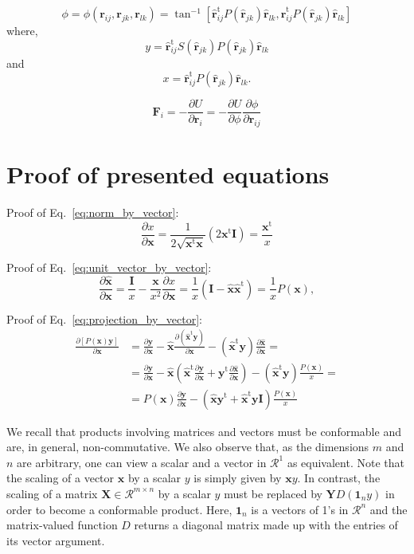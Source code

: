 \documentclass[11pt]{article}
\newcommand{\mt}[1]{\boldsymbol{\mathbf{#1}}}           %
\newcommand{\vt}[1]{\boldsymbol{\mathbf{#1}}}           %
\newcommand{\tr}[1]{#1^\text{t}}                        %
\newcommand{\diff}[2]{\frac{\partial #1}{\partial #2}}  %
\begin{document}
\begin{equation}
\phi = \phi({\vt r}_{ij},{\vt r}_{jk},{\vt r}_{lk}) = \tan^{-1}\left[\tr{\vt{\hat r}}_{ij}P(\vt{\hat r}_{jk})\vt{\hat r}_{lk}, \tr{\vt{\hat r}}_{ij}P(\vt{\hat r}_{jk})\vt{\hat r}_{lk}\right]
\end{equation}
where,
\[
y = \tr{\vt{\hat r}}_{ij} S(\vt{\hat r}_{jk}) P(\vt{\hat r}_{jk}) \vt{\hat r}_{lk}
\]
and
\[
x = \tr{\vt{\hat r}}_{ij}P(\vt{\hat r}_{jk})\vt{\hat r}_{lk}.
\]



\begin{equation}
{\vt F}_i = -\diff{U}{{\vt r}_i} = -\diff{U}{\phi}\diff{\phi}{{\vt r}_{ij}}
\end{equation}

\appendix

\section{Proof of presented equations}

Proof of Eq.~\ref{eq:norm_by_vector}:
\begin{equation}
\diff{x}{\vt x} = \frac{1}{2 \sqrt{\tr{\vt x}{\vt x}}} (2\tr{\vt x}\mt I) = \frac{\tr{\vt x}}{x}
\end{equation}

Proof of Eq.~\ref{eq:unit_vector_by_vector}:
\begin{equation}
\diff{\vt{\hat x}}{\vt x} = \frac{\mt I}{x} - \frac{\vt x}{x^2}\diff{x}{\vt x} = \frac{1}{x}\left(\mt I - {\vt{\hat x}}\tr{\vt{\hat x}}\right) = \frac{1}{x} P(\vt x),
\end{equation}

Proof of Eq.~\ref{eq:projection_by_vector}:
\[
\begin{split}
\diff{[P(\vt x)\vt y]}{\vt x} &= \diff{\vt y}{\vt x} - \vt{\hat x}\diff{(\tr{\vt{\hat x}} \vt y)}{\vt x} - (\tr{\vt{\hat x}} \vt y)\diff{\vt{\hat x}}{\vt x} = \\
&= \diff{\vt y}{\vt x} - \vt{\hat x} \left( \tr{\vt{\hat x}}\diff{\vt y}{\vt x} + \tr{\vt y} \diff{\vt{\hat x}}{\vt x} \right) - (\tr{\vt{\hat x}} \vt y)\frac{P(\vt x)}{x} = \\
&= P(\vt x) \diff{\vt y}{\vt x} - (\vt{\hat x} \tr{\vt y} + \tr{\vt{\hat x}} \vt y \mt I)\frac{P(\vt x)}{x}
\end{split}
\]

We recall that products involving matrices and vectors must be conformable and are, in general, non-commutative. We also observe that, as the dimensions $m$ and $n$ are arbitrary, one can view a scalar and a vector in $\mathcal{R}^1$ as equivalent. Note that the scaling of a vector $\vt x$ by a scalar $y$ is simply given by $\vt x y$. In contrast, the scaling of a matrix $\mt X \in \mathcal{R}^{m \times n}$ by a scalar $y$ must be replaced by $\mt Y D(\vt 1_n y)$ in order to become a conformable product. Here, $\vt 1_n$ is a vectors of 1's in $\mathcal{R}^n$ and the matrix-valued function $D$ returns a diagonal matrix made up with the entries of its vector argument.
\end{document}

